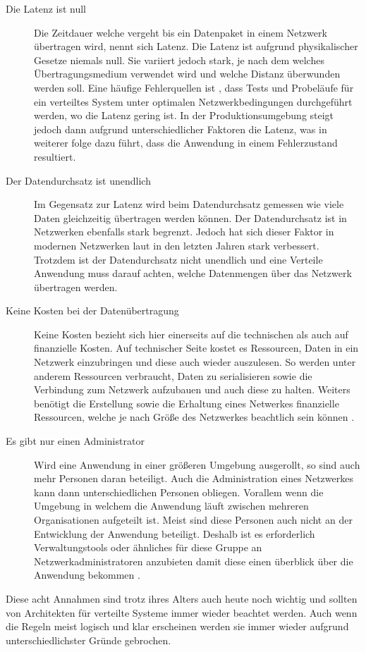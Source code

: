 \begin{description}
    \item[Die Latenz ist null]
    Die Zeitdauer welche vergeht bis ein Datenpaket in einem Netzwerk übertragen wird, nennt sich Latenz. Die Latenz ist aufgrund physikalischer Gesetze niemals null. Sie variiert jedoch stark, je nach dem welches Übertragungsmedium verwendet wird und welche Distanz überwunden werden soll. Eine häufige  Fehlerquellen ist \cite{rotem2006fallacies}, dass Tests und Probeläufe für ein verteiltes System unter optimalen Netzwerkbedingungen durchgeführt werden, wo die Latenz gering ist. In der Produktionsumgebung steigt jedoch dann aufgrund unterschiedlicher Faktoren die Latenz, was in weiterer folge dazu führt, dass die Anwendung in einem Fehlerzustand resultiert. 
    \item[Der Datendurchsatz ist unendlich]
    Im Gegensatz zur Latenz wird beim Datendurchsatz gemessen wie viele Daten gleichzeitig übertragen werden können. Der Datendurchsatz ist in Netzwerken ebenfalls stark begrenzt. Jedoch hat sich dieser Faktor in modernen Netzwerken laut \cite{rotem2006fallacies} in den letzten Jahren stark verbessert. Trotzdem ist der Datendurchsatz nicht unendlich und eine Verteile Anwendung muss darauf achten, welche Datenmengen über das Netzwerk übertragen werden.  
    \item[Keine Kosten bei der Datenübertragung]
    Keine Kosten bezieht sich hier einerseits auf die technischen als auch auf finanzielle Kosten. Auf technischer Seite kostet es Ressourcen, Daten in ein Netzwerk einzubringen und diese auch wieder auszulesen. So werden unter anderem Ressourcen verbraucht, Daten zu serialisieren sowie die Verbindung zum Netzwerk aufzubauen und auch diese zu halten. Weiters benötigt die Erstellung sowie die Erhaltung eines Netwerkes finanzielle Ressourcen, welche je nach Größe des Netzwerkes beachtlich sein können \cite{rotem2006fallacies}.
    \item[Es gibt nur einen Administrator]
    Wird eine Anwendung in einer größeren Umgebung ausgerollt, so sind auch mehr Personen daran beteiligt. Auch die Administration eines Netzwerkes kann dann unterschiedlichen Personen obliegen. Vorallem wenn die Umgebung in welchem die Anwendung läuft zwischen mehreren Organisationen aufgeteilt ist. Meist sind diese Personen auch nicht an der Entwicklung der Anwendung beteiligt. Deshalb ist es erforderlich Verwaltungstools oder ähnliches für diese Gruppe an Netzwerkadministratoren anzubieten damit diese einen überblick über die Anwendung bekommen \cite{rotem2006fallacies}.  
\end{description}
Diese acht Annahmen sind trotz ihres Alters auch heute noch wichtig und sollten von Architekten für verteilte Systeme immer wieder beachtet werden. Auch wenn die Regeln meist logisch und klar erscheinen werden sie immer wieder aufgrund unterschiedlichster Gründe gebrochen. \cite{rotem2006fallacies} 

